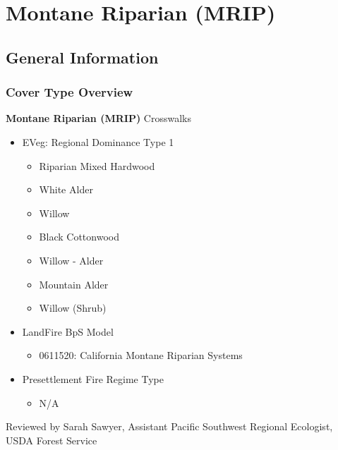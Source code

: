 \newpage
\section{Montane Riparian (MRIP)}

\subsection*{General Information}

\subsubsection{Cover Type Overview}

\textbf{Montane Riparian (MRIP)}
\newline
Crosswalks
\begin{itemize}
	\item EVeg: Regional Dominance Type 1
	\begin{itemize}
		\item Riparian Mixed Hardwood
		\item White Alder
		\item Willow
		\item Black Cottonwood
		\item Willow - Alder
		\item Mountain Alder
		\item Willow (Shrub)
	\end{itemize}

	\item LandFire BpS Model
	\begin{itemize}
		\item 0611520: California Montane Riparian Systems 
	\end{itemize}

	\item Presettlement Fire Regime Type
	\begin{itemize}
		\item N/A
	\end{itemize}
\end{itemize}

\noindent Reviewed by Sarah Sawyer, Assistant Pacific Southwest Regional Ecologist, USDA Forest Service

